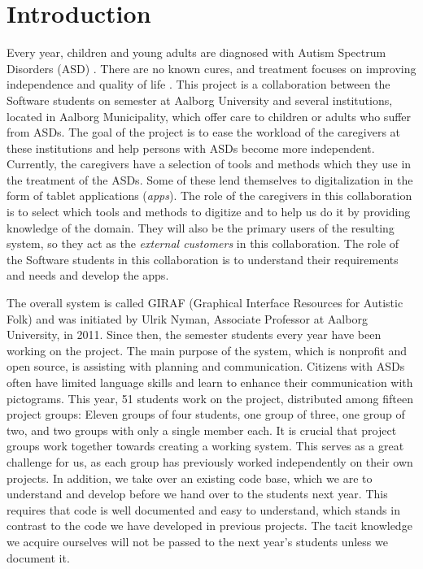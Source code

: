 \chapter{Introduction}
Every year, children and young adults are diagnosed with Autism Spectrum Disorders (ASD) \cite{autism_diagnosis_adults,autism_diagnosis_children}. There are no known cures, and treatment focuses on improving independence and quality of life \cite{Myers01112007}. This project is a collaboration between the Software students on  semester at Aalborg University and several institutions, located in Aalborg Municipality, which offer care to children or adults who suffer from ASDs. The goal of the project is to ease the workload of the caregivers at these institutions and help persons with ASDs become more independent. Currently, the caregivers have a selection of tools and methods which they use in the treatment of the ASDs. Some of these lend themselves to digitalization in the form of tablet applications (\emph{apps}). The role of the caregivers in this collaboration is to select which tools and methods to digitize and to help us do it by providing knowledge of the domain. They will also be the primary users of the resulting system, so they act as the \emph{external customers} in this collaboration. The role of the Software students in this collaboration is to understand their requirements and needs and develop the apps.

The overall system is called GIRAF (Graphical Interface Resources for Autistic Folk) and was initiated by Ulrik Nyman, Associate Professor at Aalborg University, in 2011. Since then, the  semester students every year have been working on the project. The main purpose of the system, which is nonprofit and open source, is assisting with planning and communication. Citizens with ASDs often have limited language skills and learn to enhance their communication with pictograms. This year, 51 students work on the project, distributed among fifteen project groups: Eleven groups of four students, one group of three, one group of two, and two groups with only a single member each. It is crucial that project groups work together towards creating a working system. This serves as a great challenge for us, as each group has previously worked independently on their own projects. In addition, we take over an existing code base, which we are to understand and develop before we hand over to the students next year. This requires that code is well documented and easy to understand, which stands in contrast to the code we have developed in previous projects. The tacit knowledge we acquire ourselves will not be passed to the next year's students unless we document it.

